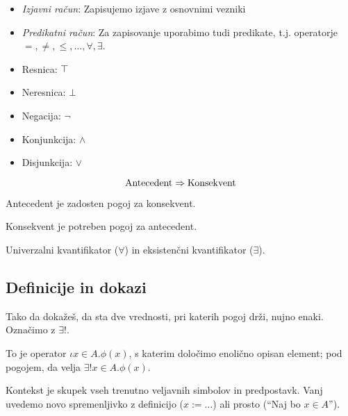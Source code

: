 \begin{itemize}
	\item \textit{Izjavni račun}: Zapisujemo izjave z osnovnimi vezniki
	\item \textit{Predikatni račun}: Za zapisovanje uporabimo tudi predikate, t.j. operatorje $=, \ne, \le, \ldots, \forall, \exists$.
\end{itemize}


\begin{itemize}
	\item Resnica: $\top$
	\item Neresnica: $\bot$
	\item Negacija: $\neg$
	\item Konjunkcija: $\land$
	\item Disjunkcija: $\lor$
\end{itemize}


\[
	\text{Antecedent} \Rightarrow \text{Konsekvent}
\]

Antecedent je zadosten pogoj za konsekvent.

Konsekvent je potreben pogoj za antecedent.


Univerzalni kvantifikator ($\forall$) in eksistenčni kvantifikator ($\exists$).

\subsection{Definicije in dokazi}


Tako da dokažeš, da sta dve vrednosti, pri katerih pogoj drži, nujno enaki. Označimo z $\exists!$.


To je operator $\iota x \in A.\phi(x)$, s katerim določimo enolično opisan element; pod pogojem, da velja $\exists!x \in A. \phi(x)$.


Kontekst je skupek vseh trenutno veljavnih simbolov in predpostavk. Vanj uvedemo novo spremenljivko z definicijo ($x := \ldots$) ali prosto ("`Naj bo $x \in A$"').

